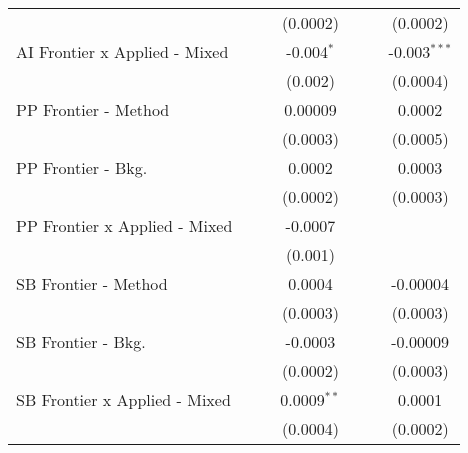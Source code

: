 \begin{tabular}{lcccccc}
                                  &                 &                 & (0.0002)        &                 &                & (0.0002)\\   
   AI Frontier x Applied - Mixed  &                 &                 & -0.004$^{*}$    &                 &                & -0.003$^{***}$\\   
                                  &                 &                 & (0.002)         &                 &                & (0.0004)\\   
   PP Frontier - Method           &                 &                 & 0.00009         &                 &                & 0.0002\\   
                                  &                 &                 & (0.0003)        &                 &                & (0.0005)\\   
   PP Frontier - Bkg.             &                 &                 & 0.0002          &                 &                & 0.0003\\   
                                  &                 &                 & (0.0002)        &                 &                & (0.0003)\\   
   PP Frontier x Applied - Mixed  &                 &                 & -0.0007         &                 &                &   \\   
                                  &                 &                 & (0.001)         &                 &                &   \\   
   SB Frontier - Method           &                 &                 & 0.0004          &                 &                & -0.00004\\   
                                  &                 &                 & (0.0003)        &                 &                & (0.0003)\\   
   SB Frontier - Bkg.             &                 &                 & -0.0003         &                 &                & -0.00009\\   
                                  &                 &                 & (0.0002)        &                 &                & (0.0003)\\   
   SB Frontier x Applied - Mixed  &                 &                 & 0.0009$^{**}$   &                 &                & 0.0001\\   
                                  &                 &                 & (0.0004)        &                 &                & (0.0002)\\   

\end{tabular}
